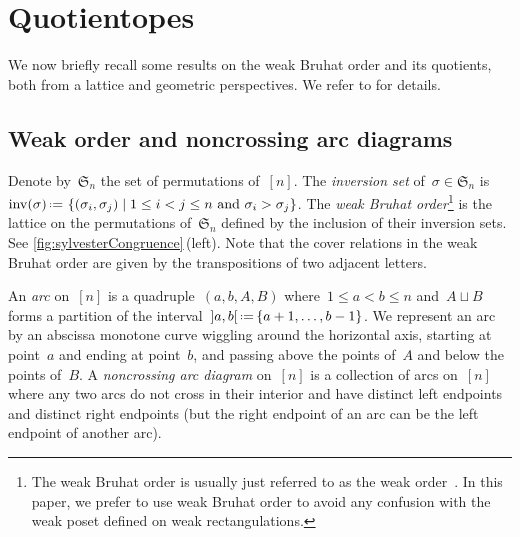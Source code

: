 \documentclass{amsart}
\theoremstyle{definition}
\newcommand{\f}[1]{\mathfrak{#1}} %
\newcommand{\set}[2]{\left\{ #1 \;\middle|\; #2 \right\}} %
\newcommand{\eqdef}{\mbox{\,\raisebox{0.2ex}{\scriptsize\ensuremath{\mathrm:}}\ensuremath{=}\,}} %
\DeclareMathOperator{\inv}{inv} %
\newcommand{\darkblue}{\color{darkblue}} %
\newcommand{\defn}[1]{\textsl{\darkblue #1}} %
\begin{document}

\section{Quotientopes}
\label{sec:quotientopes}

We now briefly recall some results on the weak Bruhat order and its quotients, both from a lattice and geometric perspectives.
We refer to \cite{MR2142177, Reading-arcDiagrams, MR3645055, MR3645056, MR3964495, MR4584712} for details.


\subsection{Weak order and noncrossing arc diagrams}
\label{subsec:noncrossingArcDiagrams}

Denote by~$\f{S}_n$ the set of permutations of~$[n]$.
The \defn{inversion set} of~$\sigma \in \f{S}_n$ is~$\inv(\sigma) \eqdef \set{(\sigma_i, \sigma_j)}{1 \le i < j \le n \text{ and } \sigma_i > \sigma_j}$.
The \defn{weak Bruhat order}\footnote{The weak Bruhat order is usually just referred to as the weak order~\cite{MR1066460, MR2133266}. In this paper, we prefer to use weak Bruhat order to avoid any confusion with the weak poset defined on weak rectangulations.} is the lattice on the permutations of~$\f{S}_n$ defined by the inclusion of their inversion sets.
See \cref{fig:sylvesterCongruence}\,(left).
Note that the cover relations in the weak Bruhat order are given by the transpositions of two adjacent letters.

An \defn{arc} on~$[n]$ is a quadruple~$(a, b, A, B)$ where~$1 \le a < b \le n$ and~$A \sqcup B$ forms a partition of the interval~${]a,b[} \eqdef \{a+1, \dots, b-1\}$.
We represent an arc by an abscissa monotone curve wiggling around the horizontal axis, starting at point~$a$ and ending at point~$b$, and passing above the points of~$A$ and below the points of~$B$.
A \defn{noncrossing arc diagram} on~$[n]$ is a collection of arcs on~$[n]$ where any two arcs do not cross in their interior and have distinct left endpoints and distinct right endpoints (but the right endpoint of an arc can be the left endpoint of another arc).
\end{document}
